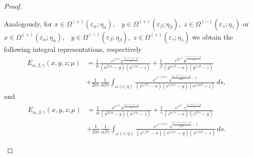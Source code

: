 \documentclass[10pt,a4paper]{amsart}
\begin{document}
\begin{proof}
\begin{remark} Analogously, for  $x\in\Omega^{(+)}(\varepsilon_{\alpha};\eta_\alpha),$
\,
$y\in\Omega^{(+)}(\varepsilon_{\beta};\eta_\beta)$,\, $z\in\Omega^{(-)}(\varepsilon_{\gamma};\eta_\gamma)$ or $x\in\Omega^{(+)}(\varepsilon_{\alpha};\eta_\alpha),$
\,
$y\in\Omega^{(-)}(\varepsilon_{\beta};\eta_\beta)$,\, $z\in\Omega^{(+)}(\varepsilon_{\gamma};\eta_\gamma)$
we obtain the following integral representations, respectively 
$$\begin{aligned}
E_{\alpha,\beta,\gamma}(x,y,z;\mu)
&=\frac{1}{\alpha}\frac{
e^{x^{1/\alpha}}
\,x^{\frac{\beta+\gamma+1-\mu}{\alpha}}}
{(x^{\beta/\alpha}-y)(x^{\gamma/\alpha}-z)}+\frac{1}{\beta}\frac{
e^{y^{1/\beta}}
\,y^{\frac{\alpha+\gamma+1-\mu}{\beta}}}
{(y^{\alpha/\beta}-x)(y^{\gamma/\beta}-z)}\\
&+
\frac{1}{2\pi i}\,
\frac{1}{\alpha\beta\gamma}
\int_{\omega(\varepsilon;\eta)}
\frac{
e^{s^{1/(\alpha\beta\gamma)}}
\,s^{\frac{\alpha+\beta+\gamma+1-\mu}{\alpha\beta\gamma}-1}
}
{
(s^{1/\beta\gamma}-x)(s^{1/\alpha\gamma}-y)(s^{1/\alpha\beta}-z)
}
\,ds,\end{aligned}
$$
and 
$$\begin{aligned}
E_{\alpha,\beta,\gamma}(x,y,z;\mu)
&=\frac{1}{\alpha}\frac{
e^{x^{1/\alpha}}
\,x^{\frac{\beta+\gamma+1-\mu}{\alpha}}}
{(x^{\beta/\alpha}-y)(x^{\gamma/\alpha}-z)}+\frac{1}{\gamma}\frac{
e^{z^{1/\gamma}}
\,z^{\frac{\alpha+\beta+1-\mu}{\gamma}}}
{(z^{\alpha/\gamma}-x)(z^{\beta/\gamma}-y)}\\
&+
\frac{1}{2\pi i}\,
\frac{1}{\alpha\beta\gamma}
\int_{\omega(\varepsilon;\eta)}
\frac{
e^{s^{1/(\alpha\beta\gamma)}}
\,s^{\frac{\alpha+\beta+\gamma+1-\mu}{\alpha\beta\gamma}-1}
}
{
(s^{1/\beta\gamma}-x)(s^{1/\alpha\gamma}-y)(s^{1/\alpha\beta}-z)
}
\,ds.\end{aligned}
$$\end{remark}


\end{proof}
\end{document}
